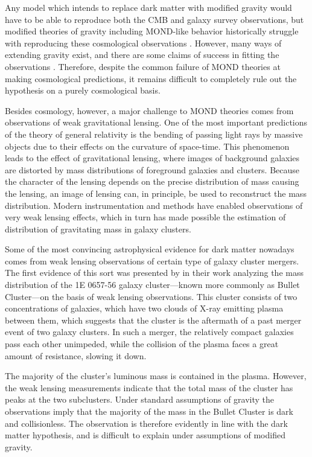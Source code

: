 \documentclass[b5paper, 10pt, twoside]{book}
\begin{document}
Any model which intends to replace dark matter with modified gravity would have to be able to reproduce both the CMB and galaxy survey observations, but modified theories of gravity including MOND-like behavior historically struggle with reproducing these cosmological observations \parencites{XuWangZhang2015, TanWoodard2018, ZlosnikSkordis2017}. However, many ways of extending gravity exist, and there are some claims of success in fitting the observations \parencite{SkordisZlosnik2021}. Therefore, despite the common failure of MOND theories at making cosmological predictions, it remains difficult to completely rule out the hypothesis on a purely cosmological basis.

Besides cosmology, however, a major challenge to MOND theories comes from observations of weak gravitational lensing. One of the most important predictions of the theory of general relativity is the bending of passing light rays by massive objects due to their effects on the curvature of space-time. This phenomenon leads to the effect of gravitational lensing, where images of background galaxies are distorted by mass distributions of foreground galaxies and clusters. Because the character of the lensing depends on the precise distribution of mass causing the lensing, an image of lensing can, in principle, be used to reconstruct the mass distribution. Modern instrumentation and methods have enabled observations of very weak lensing effects, which in turn has made possible the estimation of distribution of gravitating mass in galaxy clusters.

Some of the most convincing astrophysical evidence for dark matter nowadays comes from weak lensing observations of certain type of galaxy cluster mergers. The first evidence of this sort was presented by \textcite{CloweEtAl2006} in their work analyzing the mass distribution of the 1E 0657-56 galaxy cluster---known more commonly as Bullet Cluster---on the basis of weak lensing observations. This cluster consists of two concentrations of galaxies, which have two clouds of X-ray emitting plasma between them, which suggests that the cluster is the aftermath of a past merger event of two galaxy clusters. In such a merger, the relatively compact galaxies pass each other unimpeded, while the collision of the plasma faces a great amount of resistance, slowing it down.

The majority of the cluster's luminous mass is contained in the plasma. However, the weak lensing measurements indicate that the total mass of the cluster has peaks at the two subclusters. Under standard assumptions of gravity the observations imply that the majority of the mass in the Bullet Cluster is dark and collisionless. The observation is therefore evidently in line with the dark matter hypothesis, and is difficult to explain under assumptions of modified gravity.
\end{document}
